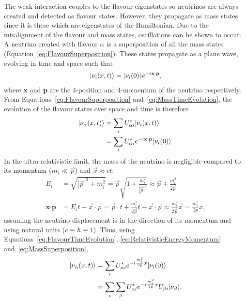 The weak interaction couples to the flavour eigenstates so neutrinos are always created and detected as flavour states.  However, they propagate as mass states since it is these which are eigenstates of the Hamiltonian.  Due to the misalignment of the flavour and mass states, oscillations can be shown to occur.  A neutrino created with flavour $\alpha$ is a superposition of all the mass states (Equation~\ref{eq:FlavourSuperposition}).  These states propagate as a plane wave, evolving in time and space such that
\begin{equation}\label{eq:MassTimeEvolution}
  \lvert\nu_i(x,t)\rangle = \lvert\nu_i (0)\rangle e^{-i \textbf{x} \cdot \textbf{p}},
\end{equation}
where \textbf{x} and \textbf{p} are the 4-position and 4-momentum of the neutrino respectively.  From Equations~\ref{eq:FlavourSuperposition} and~\ref{eq:MassTimeEvolution}, the evolution of the flavour states over space and time is therefore
\begin{align}
  \nonumber \lvert\nu_{\alpha}(x,t)\rangle &= \sum_i U_{\alpha i}^* \lvert\nu_i (x,t)\rangle \\
  \label{eq:FlavourTimeEvolution} &= \sum_i U_{\alpha i}^* e^{-i \textbf{x} \cdot \textbf{p}} \lvert\nu_i(0)\rangle .
\end{align}
In the ultra-relativistic limit, the mass of the neutrino is negligible compared to its momentum ($m_i \ll \vec{p}$) and $\vec{x} \approx ct$;
\begin{align}
  \label{eq:RelativisticEnergy} E_i &= \sqrt{|\vec{p}|^2+m_i^2} = \vec{p}\sqrt{1+\frac{m_i^2}{|\vec{p}|^2}} \approx \vec{p}+\frac{m_i^2}{2\vec{p}} \\
  \label{eq:RelativisticEnergyMomentum} \textbf{x}\cdot\textbf{p} &= E_i t - \vec{x}\cdot\vec{p} = \vec{p}\cdot t + \frac{m_i^2}{2\vec{p}}t - \vec{x}\cdot\vec{p} \approx \frac{m_i^2}{2\vec{p}}\vec{x} = \frac{m_i^2}{2p}x ,
\end{align}
assuming the neutrino displacement is in the direction of its momentum and using natural units ($c \equiv \hbar \equiv 1$).  Thus, using Equations~\ref{eq:FlavourTimeEvolution}, \ref{eq:RelativisticEnergyMomentum} and~\ref{eq:MassSuperposition},
\begin{align}
  \nonumber \lvert\nu_{\alpha}(x,t)\rangle &= \sum_i U_{\alpha i}^* e^{-i \frac{m_i^2}{2p} x} \lvert\nu_i (0)\rangle \\
  \label{eq:FlavourEvolution} &= \sum_i \sum_{\beta} U_{\alpha i}^* e^{-i \frac{m_i^2}{2p} x} U_{\beta i} \lvert\nu_{\beta}\rangle.
\end{align}

